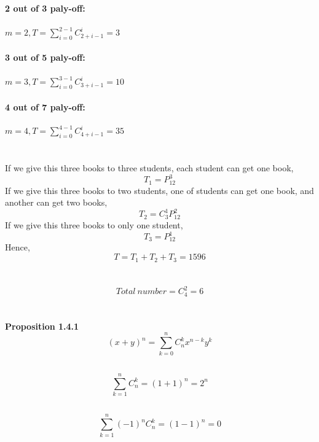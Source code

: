 \documentclass{article}
\begin{document}
        \subsection{}
                \textbf{2 out of 3 paly-off:}
                \\
                \\
                $m=2, T=\sum _{i=0} ^{2-1} C_{2+i-1} ^{i}=3$
                \\
                \\
                \textbf{3 out of 5 paly-off:}
                \\
                \\
                $m=3, T=\sum _{i=0} ^{3-1} C_{3+i-1} ^{i}=10$
                \\
                \\
                \textbf{4 out of 7 paly-off:}
                \\
                \\
                $m=4, T=\sum _{i=0} ^{4-1} C_{4+i-1} ^{i}=35$
    \section{}
        If we give this three books to three students, each student can get one book,
        $$T_1=P_{12}^3$$
        If we give this three books to two students, one of students can get one book, and another can get two books,
        $$T_2=C_3^1 P_{12}^{2}$$
        If we give this three books to only one student,
        $$T_3=P_{12}^1$$
        Hence,
        $$T=T_1+T_2+T_3=1596$$
    
    \section{}
        $$Total \ number =C_4 ^2 =6$$
    
    \section{}
        \textbf{Proposition 1.4.1}
        $$(x+y)^n=\sum _{k=0} ^n C_n^k x^{n-k}y^k$$

        \subsection{}
                $$\sum _{k=1}^{n}C_n ^k=(1+1)^n=2^n$$
        \subsection{}
                $$\sum _{k=1}^{n}(-1)^nC_n ^k=(1-1)^n=0$$
\end{document}
